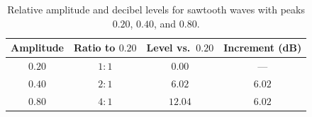 \begin{table}[htbp]
  \centering
  \caption{Relative amplitude and decibel levels for sawtooth waves with peaks $0.20$, $0.40$, and $0.80$.}
  \label{tab:loudness-comparison}
  \begin{tabular}{cccc}
    \toprule
    Amplitude & Ratio to $0.20$ & Level vs.\ $0.20$ & Increment (dB) \\
    \midrule
    $0.20$ & $1{:}1$ & $0.00$ & --- \\
    $0.40$ & $2{:}1$ & $6.02$ & $6.02$ \\
    $0.80$ & $4{:}1$ & $12.04$ & $6.02$ \\
    \bottomrule
  \end{tabular}
\end{table}
